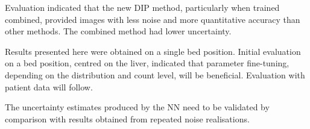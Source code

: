         Evaluation indicated that the new \gls{DIP} method, particularly when trained combined, provided images with less noise and more quantitative accuracy than other methods. The combined method had lower uncertainty.
    
        Results presented here were obtained on a single bed position. Initial evaluation on a bed position, centred on the liver, indicated that parameter fine-tuning, depending on the distribution and count level, will be beneficial. Evaluation with patient data will follow.
        
        The uncertainty estimates produced by the \gls{NN} need to be validated by comparison with results obtained from repeated noise realisations.
        
    